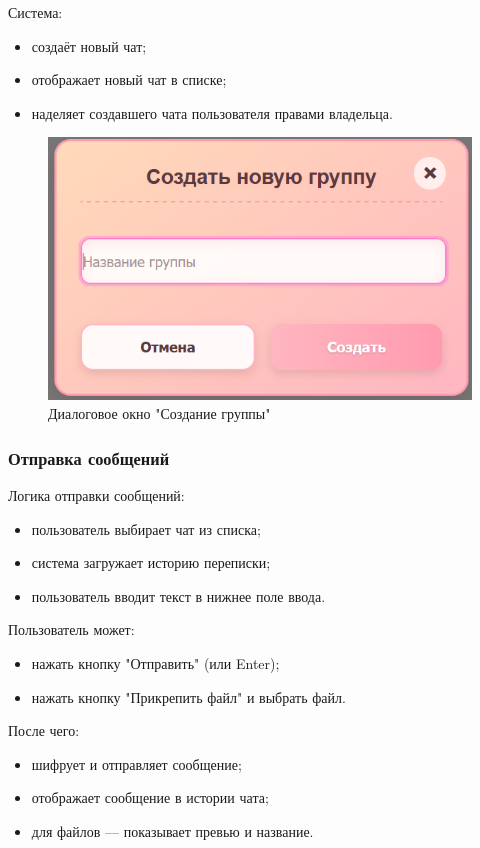 Система:

\begin{itemize}		
\item создаёт новый чат;  
\item отображает новый чат в списке;
\item наделяет создавшего чата пользователя правами владельца.
\end{itemize}

\begin{figure}[ht]
	\centering
	\includegraphics[width=0.8\linewidth]{"images/Окно создания группы"}
	\caption{Диалоговое окно "Создание группы"}
	\label{fig:create-group}
\end{figure}

\subsubsection{Отправка сообщений}  
Логика отправки сообщений:  
\begin{itemize}  
	\item пользователь выбирает чат из списка;  
	\item система загружает историю переписки;  
	\item пользователь вводит текст в нижнее поле ввода.
\end{itemize}

Пользователь может:

\begin{itemize}
		\item нажать кнопку "Отправить" (или Enter);  
		\item нажать кнопку "Прикрепить файл" и выбрать файл.
\end{itemize}

После чего:

\begin{itemize}
		\item шифрует и отправляет сообщение;  
		\item отображает сообщение в истории чата;  
		\item для файлов — показывает превью и название.   
\end{itemize}  

